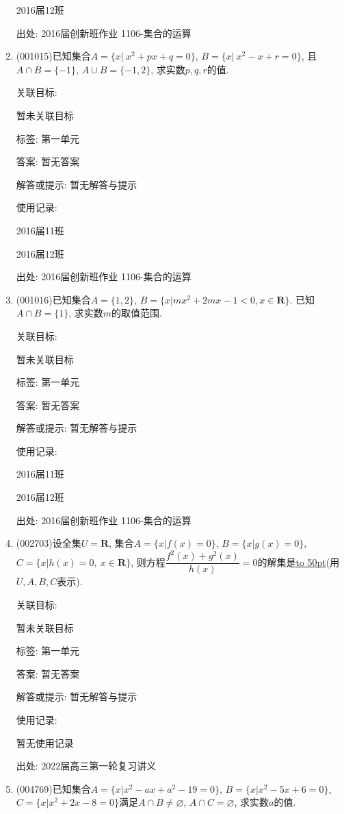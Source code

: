 \documentclass[10pt,a4paper]{article}
\newcommand{\blank}[1]{\underline{\hbox to #1pt{}}}
\begin{document}
\begin{enumerate}[1.]
2016届12班	


出处: 2016届创新班作业	1106-集合的运算
\item { (001015)}已知集合$A=\{x|\ x^2+px+q=0\}$, $B=\{x|\ x^2-x+r=0\}$, 且$A\cap B=\{-1\}$, $A\cup B=\{-1,2\}$, 求实数$p,q,r$的值.


关联目标:

暂未关联目标



标签: 第一单元

答案: 暂无答案

解答或提示: 暂无解答与提示

使用记录:

2016届11班	

2016届12班	


出处: 2016届创新班作业	1106-集合的运算
\item { (001016)}已知集合$A=\{1,2\}$, $B=\{x|mx^2+2mx-1<0, x \in\mathbf{R}\}$. 已知$A \cap B=\{1\}$, 求实数$m$的取值范围.


关联目标:

暂未关联目标



标签: 第一单元

答案: 暂无答案

解答或提示: 暂无解答与提示

使用记录:

2016届11班	

2016届12班	


出处: 2016届创新班作业	1106-集合的运算
\item { (002703)}设全集$U=\mathbf{R}$, 集合$A=\{x|f(x)=0\}$, $B=\{x|g(x)=0\}$, $C=\{x|h(x)=0, \ x\in \mathbf{R}\}$, 则方程$\dfrac{f^2(x)+g^2(x)}{h(x)}=0$的解集是\blank{50}(用$U,A,B,C$表示).


关联目标:

暂未关联目标



标签: 第一单元

答案: 暂无答案

解答或提示: 暂无解答与提示

使用记录:

暂无使用记录


出处: 2022届高三第一轮复习讲义
\item { (004769)}已知集合$A=\{x|x^2- ax+a^2-19=0\}$, $B=\{x|x^2-5x+6=0\}$, $C=\{ x|x^2+2x-8=0\}$满足$A\cap B\ne \varnothing$, $A\cap C=\varnothing$, 求实数$a$的值.



\end{enumerate}
\end{document}

